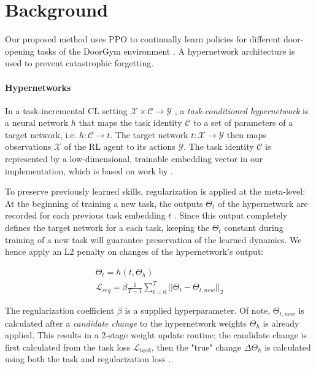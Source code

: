 \documentclass[dvipsnames]{article} %
\newcommand{\commentOLD}[1]{}
\newcommand{\asOLD}[1] {\commentOLD{{\color{orange} AS: #1}}}              %
\begin{document}
\section{Background}
\asOLD{There should be here an introductory sentence on the areas you are going to review below and why. There has to be a link between them.}
Our proposed method uses PPO \citep{ppo} to continually learn policies for different door-opening tasks of the DoorGym environment \citep{doorgym}. A hypernetwork \citep{CLHypernetworks} architecture is used to prevent catastrophic forgetting.

\paragraph{Hypernetworks}
In a task-incremental CL setting $\mathcal{X}\times\mathcal{C}\rightarrow\mathcal{Y}$ \citep{threescenarios}, a \textit{task-conditioned hypernetwork} is a neural network $h$ that maps the task identity $\mathcal{C}$ to a set of parameters of a target network, i.e. $h:\mathcal{C}\rightarrow t$. The target network $t:\mathcal{X}\rightarrow\mathcal{Y}$ then maps observations $\mathcal{X}$ of the RL agent to its actions $\mathcal{Y}$. The task identity $\mathcal{C}$ is represented by a low-dimensional, trainable embedding vector in our implementation, which is based on work by \citet{auddyHollensteinClfd}.

To preserve previously learned skills, regularization is applied at the meta-level: At the beginning of training a new task, the outputs $\Theta_t$ of the hypernetwork are recorded for each previous task embedding $t$ \citep{CLHypernetworks}. Since this output completely defines the target network for a each task, keeping the $\Theta_t$ constant during training of a new task will guarantee preservation of the learned dynamics. We hence apply an L2 penalty on changes of the hypernetwork's output:

\begin{gather}
    \Theta_t=h(t, \Theta_h) \\
    \mathcal{L}_{reg} = \beta\frac{1}{T-1}\sum^T_{t=0} ||\Theta_t - \Theta_{t,new}||_2 \label{regloss}
\end{gather}

The regularization coefficient $\beta$ is a supplied hyperparameter. Of note, $\Theta_{t,new}$ is calculated after a \textit{candidate change} to the hypernetwork weights $\Theta_h$ is already applied. This results in a 2-stage weight update routine; the candidate change is first calculated from the task loss $\mathcal{L}_{task}$, then the "true" change $\Delta\Theta_h$ is calculated using both the task and regularization loss \citep{CLHypernetworks}. 
\end{document}
